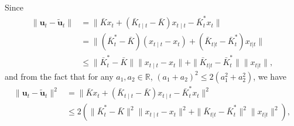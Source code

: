\documentclass[letterpaper, 10 pt, conference]{ieeeconf}  %
\newcommand{\contTilde}[1]{\mathbf{\tilde{#1}}}
\begin{document}
Since
\begin{align*}
    \|\mathbf{u}_{t} - \contTilde{u}_{t}\|
    &= \|\bar{K}x_{t} + (\bar{K}_{t\mid t}-\bar{K})x_{t\mid t} - \bar{K}_{t}^{*}x_{t}\|\\
    &= \|(\bar{K}_{t}^{*}-\bar{K})(x_{t\mid t}-x_{t})  + (\bar{K}_{t|t}-\bar{K}_{t}^{*})x_{t|t}\|\\
    &\leq \|\bar{K}_{t}^{*}-\bar{K}\|\|x_{t\mid t}-x_{t}\|  + \|\bar{K}_{t|t}-\bar{K}_{t}^{*}\| \|x_{t|t}\|,
\end{align*}
and from the fact that for any $a_{1}, a_{2} \in \mathbb{R}$, $(a_{1}+a_{2})^2 \leq 2(a_{1}^{2}+a_{2}^{2})$,
 we have
\begin{align*}
    \|\mathbf{u}_{t} - \contTilde{u}_{t}\|^{2}
    &= \|\bar{K}x_{t} + (\bar{K}_{t\mid t}-\bar{K})x_{t\mid t} - \bar{K}_{t}^{*}x_{t}\|^{2}\\
    &\leq 2(\|\bar{K}_{t}^{*}-\bar{K}\|^{2}\|x_{t\mid t}-x_{t}\|^{2}  + \|\bar{K}_{t|t}-\bar{K}_{t}^{*}\|^{2} \|x_{t|t}\|^{2}),
\end{align*}
\end{document}
